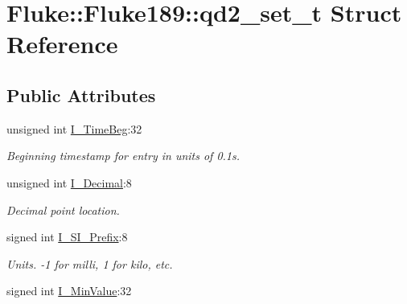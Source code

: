 \hypertarget{structFluke_1_1Fluke189_1_1qd2__set__t}{
\section{Fluke::Fluke189::qd2\_\-set\_\-t Struct Reference}
\label{structFluke_1_1Fluke189_1_1qd2__set__t}
}
\subsection*{Public Attributes}
\begin{DoxyCompactItemize}
\item 
\hypertarget{structFluke_1_1Fluke189_1_1qd2__set__t_ad5d35f66cd39c8e81fa530bd5961cafa}{
unsigned int \hyperlink{structFluke_1_1Fluke189_1_1qd2__set__t_ad5d35f66cd39c8e81fa530bd5961cafa}{I\_\-TimeBeg}:32}
\label{structFluke_1_1Fluke189_1_1qd2__set__t_ad5d35f66cd39c8e81fa530bd5961cafa}

\begin{DoxyCompactList}\small\item\em Beginning timestamp for entry in units of 0.1s. \item\end{DoxyCompactList}\item 
\hypertarget{structFluke_1_1Fluke189_1_1qd2__set__t_a69baa0b996d4ce66d6059e4e1d0b807a}{
unsigned int \hyperlink{structFluke_1_1Fluke189_1_1qd2__set__t_a69baa0b996d4ce66d6059e4e1d0b807a}{I\_\-Decimal}:8}
\label{structFluke_1_1Fluke189_1_1qd2__set__t_a69baa0b996d4ce66d6059e4e1d0b807a}

\begin{DoxyCompactList}\small\item\em Decimal point location. \item\end{DoxyCompactList}\item 
\hypertarget{structFluke_1_1Fluke189_1_1qd2__set__t_a9bf110d1b46dc0f6757b192be616d0f7}{
signed int \hyperlink{structFluke_1_1Fluke189_1_1qd2__set__t_a9bf110d1b46dc0f6757b192be616d0f7}{I\_\-SI\_\-Prefix}:8}
\label{structFluke_1_1Fluke189_1_1qd2__set__t_a9bf110d1b46dc0f6757b192be616d0f7}

\begin{DoxyCompactList}\small\item\em Units. -\/1 for milli, 1 for kilo, etc. \item\end{DoxyCompactList}\item 
\hypertarget{structFluke_1_1Fluke189_1_1qd2__set__t_a3f91933041945b6ebacdb3b032a45f1b}{
signed int \hyperlink{structFluke_1_1Fluke189_1_1qd2__set__t_a3f91933041945b6ebacdb3b032a45f1b}{I\_\-MinValue}:32}
\label{structFluke_1_1Fluke189_1_1qd2__set__t_a3f91933041945b6ebacdb3b032a45f1b}


\end{DoxyCompactItemize}
